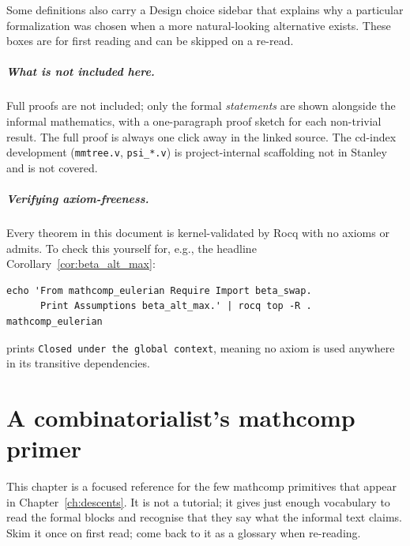 \noindent Some definitions also carry a \textsf{Design choice}
sidebar that explains why a particular formalization was chosen
when a more natural-looking alternative exists. These boxes are
for first reading and can be skipped on a re-read.

\paragraph{What is \emph{not} included here.}
Full proofs are not included; only the formal \emph{statements} are
shown alongside the informal mathematics, with a one-paragraph proof
sketch for each non-trivial result. The full proof is always one
click away in the linked source. The cd-index development
(\texttt{mmtree.v}, \texttt{psi\_*.v}) is project-internal scaffolding
not in Stanley and is not covered.

\paragraph{Verifying axiom-freeness.} Every theorem in this document
is kernel-validated by Rocq with no axioms or admits. To check this
yourself for, e.g., the headline Corollary~\ref{cor:beta_alt_max}:

\begin{verbatim}
echo 'From mathcomp_eulerian Require Import beta_swap.
      Print Assumptions beta_alt_max.' | rocq top -R . mathcomp_eulerian
\end{verbatim}

\noindent prints \texttt{Closed under the global context}, meaning no
axiom is used anywhere in its transitive dependencies.

\clearpage

\chapter{A combinatorialist's mathcomp primer}
\label{ch:primer}

This chapter is a focused reference for the few mathcomp primitives
that appear in Chapter~\ref{ch:descents}. It is not a tutorial; it
gives just enough vocabulary to read the formal blocks and recognise
that they say what the informal text claims. Skim it once on first
read; come back to it as a glossary when re-reading.

